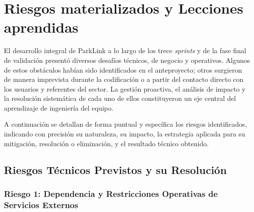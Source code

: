 \section{Riesgos materializados y Lecciones aprendidas}\label{sec:riesgos}

El desarrollo integral de ParkLink a lo largo de los trece \textit{sprints} y de la fase final de validación presentó diversos desafíos técnicos, de negocio y operativos. Algunos de estos obstáculos habían sido identificados en el anteproyecto; otros surgieron de manera imprevista durante la codificación o a partir del contacto directo con los usuarios y referentes del sector. La gestión proactiva, el análisis de impacto y la resolución sistemática de cada uno de ellos constituyeron un eje central del aprendizaje de ingeniería del equipo.

A continuación se detallan de forma puntual y específica los riesgos identificados, indicando con precisión su naturaleza, su impacto, la estrategia aplicada para su mitigación, resolución o eliminación, y el resultado técnico obtenido.

\subsection{Riesgos Técnicos Previstos y su Resolución}

\subsubsection{Riesgo 1: Dependencia y Restricciones Operativas de Servicios Externos}

